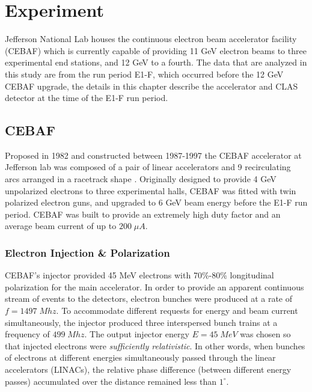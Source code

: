 \chapter{Experiment}
Jefferson National Lab houses the continuous electron beam accelerator facility (CEBAF) which is currently capable of providing 11 GeV electron beams to three experimental end stations, and 12 GeV to a fourth.  The data that are analyzed in this study are from the run period E1-F, which occurred before the 12 GeV CEBAF upgrade, the details in this chapter describe the accelerator and CLAS detector at the time of the E1-F run period.  \\

\section{CEBAF} 
Proposed in 1982 and constructed between 1987-1997 the CEBAF accelerator at Jefferson lab was composed of a pair of linear accelerators and 9 recirculating arcs arranged in a racetrack shape \cite{hardware-leemann:2001, hardware-chao:2011}.  Originally designed to provide 4 GeV unpolarized electrons to three experimental halls, CEBAF was fitted with twin polarized electron guns, and upgraded to 6 GeV beam energy before the E1-F run period.  CEBAF was built to provide an extremely high duty factor and an average beam current of up to $200 \; \mu A$.\\


\subsection{Electron Injection \& Polarization}
CEBAF's injector provided 45 MeV electrons with 70\%-80\% longitudinal polarization for the main accelerator.  In order to provide an apparent continuous stream of events to the detectors, electron bunches were produced at a rate of $f = 1497 \; Mhz$.  To accommodate different requests for energy and beam current simultaneously, the injector produced three interspersed bunch trains at a frequency of $499 \; Mhz$.  The output injector energy $E = 45 \; MeV$ was chosen so that injected electrons were \textit{sufficiently relativistic}.  In other words, when bunches of electrons at different energies simultaneously passed through the linear accelerators (LINACs), the relative phase difference (between different energy passes) accumulated over the distance remained less than $1^\circ$. \\


